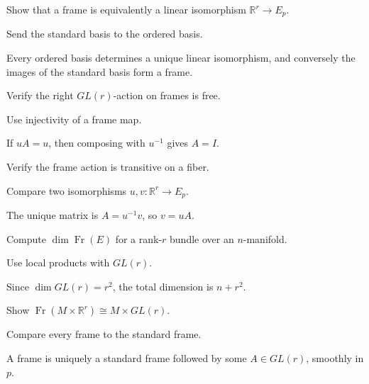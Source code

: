 \begin{exercise}\label{exr:vii08-10}
Show that a frame is equivalently a linear isomorphism \(\mathbb R^r\to E_p\).
\end{exercise}
\begin{hint}
Send the standard basis to the ordered basis.
\end{hint}
\begin{solution}
Every ordered basis determines a unique linear isomorphism, and conversely the images of the standard basis form a frame.
\end{solution}

\begin{exercise}\label{exr:vii08-11}
Verify the right \(GL(r)\)-action on frames is free.
\end{exercise}
\begin{hint}
Use injectivity of a frame map.
\end{hint}
\begin{solution}
If \(uA=u\), then composing with \(u^{-1}\) gives \(A=I\).
\end{solution}

\begin{exercise}\label{exr:vii08-12}
Verify the frame action is transitive on a fiber.
\end{exercise}
\begin{hint}
Compare two isomorphisms \(u,v:\mathbb R^r\to E_p\).
\end{hint}
\begin{solution}
The unique matrix is \(A=u^{-1}v\), so \(v=uA\).
\end{solution}

\begin{exercise}\label{exr:vii08-13}
Compute \(\dim \operatorname{Fr}(E)\) for a rank-\(r\) bundle over an \(n\)-manifold.
\end{exercise}
\begin{hint}
Use local products with \(GL(r)\).
\end{hint}
\begin{solution}
Since \(\dim GL(r)=r^2\), the total dimension is \(n+r^2\).
\end{solution}

\begin{exercise}\label{exr:vii08-14}
Show \(\operatorname{Fr}(M\times\mathbb R^r)\cong M\times GL(r)\).
\end{exercise}
\begin{hint}
Compare every frame to the standard frame.
\end{hint}
\begin{solution}
A frame is uniquely a standard frame followed by some \(A\in GL(r)\), smoothly in \(p\).
\end{solution}

